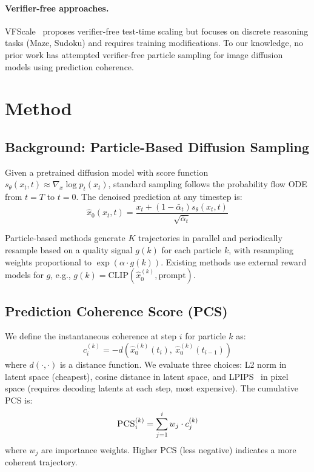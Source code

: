 \documentclass{article}
\newcommand{\pcs}{\textsc{PCS}}
\newcommand{\xhat}{\hat{x}_0}
\begin{document}
\paragraph{Verifier-free approaches.}
VFScale~\citep{vfscale2025} proposes verifier-free test-time scaling but focuses on discrete reasoning tasks (Maze, Sudoku) and requires training modifications. To our knowledge, no prior work has attempted verifier-free particle sampling for image diffusion models using prediction coherence.

\section{Method}
\label{sec:method}

\subsection{Background: Particle-Based Diffusion Sampling}

Given a pretrained diffusion model with score function $s_\theta(x_t, t) \approx \nabla_x \log p_t(x_t)$, standard sampling follows the probability flow ODE from $t=T$ to $t=0$. The denoised prediction at any timestep is:
\begin{equation}
\xhat(x_t, t) = \frac{x_t + (1 - \bar{\alpha}_t) s_\theta(x_t, t)}{\sqrt{\bar{\alpha}_t}}
\label{eq:denoised}
\end{equation}

Particle-based methods generate $K$ trajectories in parallel and periodically resample based on a quality signal $g(k)$ for each particle $k$, with resampling weights proportional to $\exp(\alpha \cdot g(k))$. Existing methods use external reward models for $g$, e.g., $g(k) = \text{CLIP}(\xhat^{(k)}, \text{prompt})$.

\subsection{Prediction Coherence Score (\pcs{})}

We define the instantaneous coherence at step $i$ for particle $k$ as:
\begin{equation}
c_i^{(k)} = -d\left(\xhat^{(k)}(t_i),\ \xhat^{(k)}(t_{i-1})\right)
\label{eq:coherence}
\end{equation}
where $d(\cdot, \cdot)$ is a distance function. We evaluate three choices: L2 norm in latent space (cheapest), cosine distance in latent space, and LPIPS~\citep{zhang2018lpips} in pixel space (requires decoding latents at each step, most expensive). The cumulative \pcs{} is:
\begin{equation}
\text{\pcs{}}_i^{(k)} = \sum_{j=1}^{i} w_j \cdot c_j^{(k)}
\label{eq:pcs}
\end{equation}
where $w_j$ are importance weights. Higher \pcs{} (less negative) indicates a more coherent trajectory.
\end{document}
